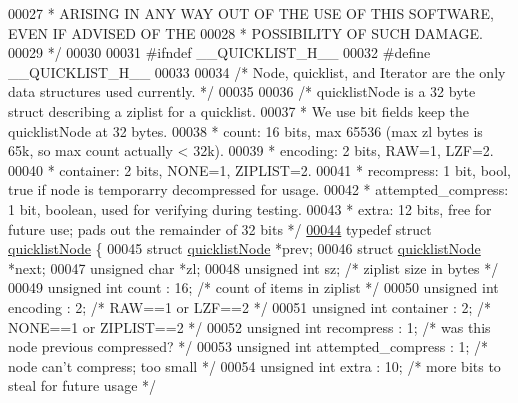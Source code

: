 \begin{DoxyCode}
00027 \textcolor{comment}{ * ARISING IN ANY WAY OUT OF THE USE OF THIS SOFTWARE, EVEN IF ADVISED OF THE}
00028 \textcolor{comment}{ * POSSIBILITY OF SUCH DAMAGE.}
00029 \textcolor{comment}{ */}
00030 
00031 \textcolor{preprocessor}{#}\textcolor{preprocessor}{ifndef} \textcolor{preprocessor}{\_\_QUICKLIST\_H\_\_}
00032 \textcolor{preprocessor}{#}\textcolor{preprocessor}{define} \textcolor{preprocessor}{\_\_QUICKLIST\_H\_\_}
00033 
00034 \textcolor{comment}{/* Node, quicklist, and Iterator are the only data structures used currently. */}
00035 
00036 \textcolor{comment}{/* quicklistNode is a 32 byte struct describing a ziplist for a quicklist.}
00037 \textcolor{comment}{ * We use bit fields keep the quicklistNode at 32 bytes.}
00038 \textcolor{comment}{ * count: 16 bits, max 65536 (max zl bytes is 65k, so max count actually < 32k).}
00039 \textcolor{comment}{ * encoding: 2 bits, RAW=1, LZF=2.}
00040 \textcolor{comment}{ * container: 2 bits, NONE=1, ZIPLIST=2.}
00041 \textcolor{comment}{ * recompress: 1 bit, bool, true if node is temporarry decompressed for usage.}
00042 \textcolor{comment}{ * attempted\_compress: 1 bit, boolean, used for verifying during testing.}
00043 \textcolor{comment}{ * extra: 12 bits, free for future use; pads out the remainder of 32 bits */}
\hyperlink{structquicklistNode}{00044} \textcolor{keyword}{typedef} \textcolor{keyword}{struct} \hyperlink{structquicklistNode}{quicklistNode} \{
00045     \textcolor{keyword}{struct} \hyperlink{structquicklistNode}{quicklistNode} *prev;
00046     \textcolor{keyword}{struct} \hyperlink{structquicklistNode}{quicklistNode} *next;
00047     \textcolor{keywordtype}{unsigned} \textcolor{keywordtype}{char} *zl;
00048     \textcolor{keywordtype}{unsigned} \textcolor{keywordtype}{int} sz;             \textcolor{comment}{/* ziplist size in bytes */}
00049     \textcolor{keywordtype}{unsigned} \textcolor{keywordtype}{int} count : 16;     \textcolor{comment}{/* count of items in ziplist */}
00050     \textcolor{keywordtype}{unsigned} \textcolor{keywordtype}{int} encoding : 2;   \textcolor{comment}{/* RAW==1 or LZF==2 */}
00051     \textcolor{keywordtype}{unsigned} \textcolor{keywordtype}{int} container : 2;  \textcolor{comment}{/* NONE==1 or ZIPLIST==2 */}
00052     \textcolor{keywordtype}{unsigned} \textcolor{keywordtype}{int} recompress : 1; \textcolor{comment}{/* was this node previous compressed? */}
00053     \textcolor{keywordtype}{unsigned} \textcolor{keywordtype}{int} attempted\_compress : 1; \textcolor{comment}{/* node can't compress; too small */}
00054     \textcolor{keywordtype}{unsigned} \textcolor{keywordtype}{int} extra : 10; \textcolor{comment}{/* more bits to steal for future usage */}

\end{DoxyCode}
